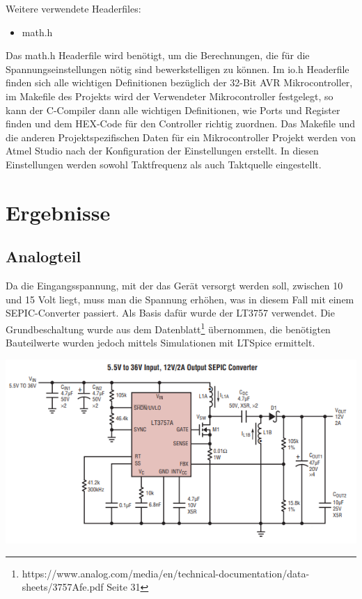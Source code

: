 \documentclass[paper=a4, 12pt]{scrreprt}
\begin{document}
	Weitere verwendete Headerfiles:
	\begin{itemize}
		\item math.h
	\end{itemize}
	Das math.h Headerfile wird benötigt, um die Berechnungen, die für die Spannungseinstellungen nötig sind bewerkstelligen zu können. \hfill \break
	Im io.h Headerfile finden sich alle wichtigen Definitionen bezüglich der 32-Bit AVR Mikrocontroller, im Makefile des Projekts wird der Verwendeter Mikrocontroller festgelegt, so kann der C-Compiler dann alle wichtigen Definitionen, wie Ports und Register finden und dem HEX-Code für den Controller richtig zuordnen. \hfill \break
	Das Makefile und die anderen Projektspezifischen Daten für ein Mikrocontroller Projekt werden von Atmel Studio nach der Konfiguration der Einstellungen erstellt. In diesen Einstellungen werden sowohl Taktfrequenz als auch Taktquelle eingestellt.
	\newpage
	
		
\chapter{Ergebnisse}\hfill \break
	\section{Analogteil}\hfill \break
	Da die Eingangsspannung, mit der das Gerät versorgt werden soll, zwischen 10 und 15 Volt liegt, muss man die Spannung erhöhen, was in diesem Fall mit einem SEPIC-Converter passiert. Als Basis dafür wurde der LT3757 verwendet.\hfill \break
	Die Grundbeschaltung wurde aus dem Datenblatt\footnote{https://www.analog.com/media/en/technical-documentation/data-sheets/3757Afe.pdf Seite 31} übernommen, die benötigten Bauteilwerte wurden jedoch mittels Simulationen mit LTSpice ermittelt.
	\begin{adjustbox}{center,caption={Referenzschaltung für SEPIC}, label={fig:LTSpice-Schaltung-Analogteil},nofloat=figure,vspace=\bigskipamount}
		\includegraphics[height=7cm]{img/Referenzschaltung_SEPIC.PNG}
	\end{adjustbox}
	\newpage
	
\end{document}
